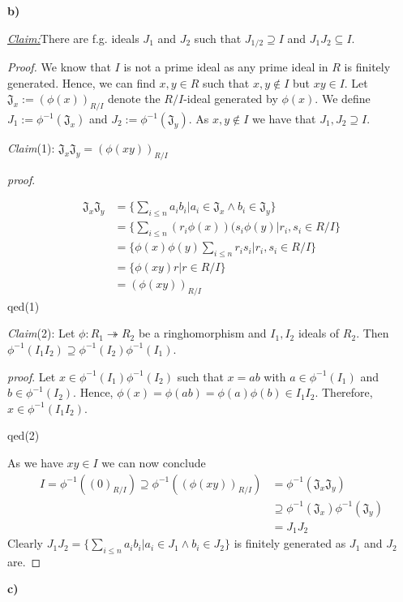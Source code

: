 \documentclass{article}
\newcommand{\inv}[1]{{#1}^{-1}}
\newcommand{\claim}
{\underline{\textit{Claim:}}\hspace{0,2cm}}
\newcommand{\subclaim}[1]
{

	\vspace*{0,2cm}
	\textit{Claim}({#1}):
}
\newcommand{\subqed}[1]{\hfill\textsf{qed}({#1})}
\newcommand{\subproof}{

\noindent\textit{proof}.\hspace{0,1cm}
}
\newcommand{\teilaufgabe}[1]{
{       

	\noindent\hspace*{0,1 cm}\textbf{#1)}
}
}
\theoremstyle{definition}
\theoremstyle{plain}
\theoremstyle{remark}
\begin{document}
	\teilaufgabe{b}\claim There are f.g. ideals $J_1$ and $J_2$ such that $J_{1/2}\supseteq I$ and $J_1J_2\subseteq I$.
\begin{proof}
	We know that $I$ is not a prime ideal as any prime ideal in $R$ is finitely generated. Hence, we can find $x,y\in R$ such that $x,y\notin I$ but $xy\in I$. Let $\mathfrak{J}_x:= (\phi(x))_{R/I}$ denote the $R/I$-ideal generated by $\phi(x)$.
	We define $J_1 := \inv{\phi}(\mathfrak{J}_x)$ and $J_2 := \inv{\phi}(\mathfrak{J}_{y})$. As $x,y\notin I$ we have that $J_1,J_2\supseteq I$. 
	\subclaim1 $\mathfrak{J}_x\mathfrak{J}_y = (\phi(xy))_{R/I}$
	\subproof 
	\begin{align}
		\mathfrak{J}_x\mathfrak{J}_y 	&= \{\sum_{i\leq n}a_ib_i|a_i\in \mathfrak{J}_x \wedge b_i\in \mathfrak{J}_y\} \\
						&= \{\sum_{i\leq n}(r_i\phi(x))(s_i\phi(y)|r_i,s_i\in R/I\} \\
						&= \{\phi(x)\phi(y)\sum_{i\leq n}r_is_i|r_i,s_i\in R/I\} \\
						&= \{\phi(xy) r|r\in R/I\}\\
						&= (\phi(xy))_{R/I}
	\end{align}
\subqed1 
\subclaim2 Let $\phi:R_1\twoheadrightarrow R_2$ be a ringhomorphism and $I_1, I_2$ ideals of $R_2$. Then $\inv{\phi}(I_1 I_2) \supseteq \inv{\phi}(I_2)\inv{\phi}(I_1)$.
\subproof Let $x\in \inv{\phi}(I_1)\inv{\phi}(I_2)$ such that $x = ab$ with $a\in \inv{\phi}(I_1)$ and $b\in\inv{\phi}(I_2)$. Hence, $\phi(x)=\phi(ab)=\phi(a)\phi(b)\in I_1I_2$. Therefore, $x\in \phi^{-1}(I_1I_2)$.

\subqed2

	As we have $xy\in I$ we can now conclude
	\begin{align}
		I=\inv{\phi}((0)_{R/I})\supseteq \inv{\phi}((\phi(xy))_{R/I}) &= \inv{\phi}(\mathfrak{J}_x\mathfrak{J}_y) \\
							&\supseteq \phi^{-1}(\mathfrak{J}_x)\inv{\phi}(\mathfrak{J}_y)\\
							&= J_1J_2
	\end{align}
	Clearly $J_1J_2=\{\sum_{i\leq n }a_ib_i|a_i\in J_1\wedge b_i\in J_2\}$ is finitely generated as $J_1$ and $J_2$ are.
\end{proof}	
\teilaufgabe{c}
\end{document}
